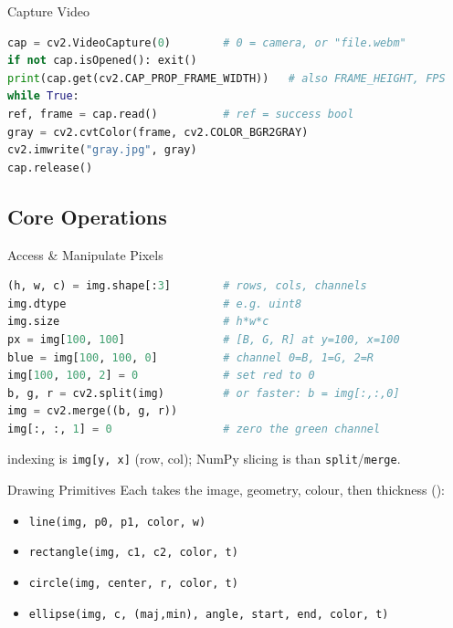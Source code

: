 \begin{KR}{Capture Video}
\begin{lstlisting}[language=Python, style=basesmol, aboveskip=2pt, belowskip=2pt]
cap = cv2.VideoCapture(0)        # 0 = camera, or "file.webm"
if not cap.isOpened(): exit()
print(cap.get(cv2.CAP_PROP_FRAME_WIDTH))   # also FRAME_HEIGHT, FPS
while True:
ref, frame = cap.read()          # ref = success bool
gray = cv2.cvtColor(frame, cv2.COLOR_BGR2GRAY)
cv2.imwrite("gray.jpg", gray)
cap.release()
\end{lstlisting}
\end{KR}

\subsection{Core Operations}

\begin{KR}{Access \& Manipulate Pixels}
\begin{lstlisting}[language=Python, style=basesmol, aboveskip=2pt, belowskip=2pt]
(h, w, c) = img.shape[:3]        # rows, cols, channels
img.dtype                        # e.g. uint8
img.size                         # h*w*c
px = img[100, 100]               # [B, G, R] at y=100, x=100
blue = img[100, 100, 0]          # channel 0=B, 1=G, 2=R
img[100, 100, 2] = 0             # set red to 0
b, g, r = cv2.split(img)         # or faster: b = img[:,:,0]
img = cv2.merge((b, g, r))
img[:, :, 1] = 0                 # zero the green channel
\end{lstlisting}
     indexing is \texttt{img[y, x]} (row, col); NumPy slicing is
     than \texttt{split}/\texttt{merge}.
\end{KR}


\begin{definition}{Drawing Primitives}
    Each takes the image, geometry,  colour, then thickness
    ():
    \begin{itemize}
        \item \texttt{line(img, p0, p1, color, w)}
        \item \texttt{rectangle(img, c1, c2, color, t)}
        \item \texttt{circle(img, center, r, color, t)}
        \item \texttt{ellipse(img, c, (maj,min), angle, start, end, color, t)}
    \end{itemize}
\end{definition}

